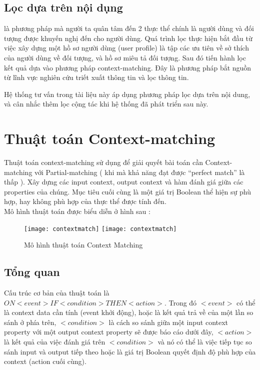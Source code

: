 \subsection{Lọc dựa trên nội dụng} là phương pháp mà người ta quân tâm đến 2 thực thể chính là người dùng và đối tượng được khuyến nghị đến cho người dùng. Quá trình lọc thực hiện bắt đầu từ việc xây dựng một hồ sơ người dùng (user profile) là tập các ưu tiên về sở thích của người dùng về đối tượng, và hồ sơ miêu tả đối tượng. Sau đó tiến hành lọc kết quả dựa vào phương pháp context-matching. Đây là phương pháp bắt nguồn từ lĩnh vực nghiên cứu triết xuất thông tin và lọc thông tin.

Hệ thống tư vấn trong tài liệu này áp dụng phương pháp lọc dựa trên nội dung, và cân nhắc thêm lọc cộng tác khi hệ thống đã phát triển sau này.

\section{Thuật toán Context-matching}
Thuật toán context-matching sử dụng để giải quyết bài toán cần Context-matching với Partial-matching ( khi mà khả năng đạt được “perfect match” là thấp ). Xây dựng các input context, output context và hàm đánh giá giữa các properties của chúng. Mục tiêu cuối cùng là một giá trị Boolean thể hiện sự phù hợp, hay không phù hợp của thực thể được tính đến.\\

Mô hình thuật toán được biểu diễn ở hình sau : 

\begin{figure}[!htbp]
  \begin{center}
    \ifpdf
      \texttt{[image: contextmatch]}
    \else
      \texttt{[image: contextmatch]}
    \fi
    \caption{Mô hình thuật toán Context Matching }
    \label{ContextMatching}
  \end{center}
\end{figure}
\subsection{Tổng quan}	
Cấu trúc cơ bản của thuật toán là ${ON <event> IF <condition> THEN <action>}$. Trong đó $<event>$ có thể là context data cần tính (event khởi động), hoặc là kết quả trả về của một lần so sánh ở phía trên, $<condition>$ là cách so sánh giữa một input context property với một output context property sẽ được báo cáo dưới đây, $<action>$ là kết quả của việc đánh giá trên $<condition>$ và nó có thể là việc tiếp tục so sánh input và output tiếp theo hoặc là giá trị Boolean quyết định độ phù hợp của context (action cuối cùng).
